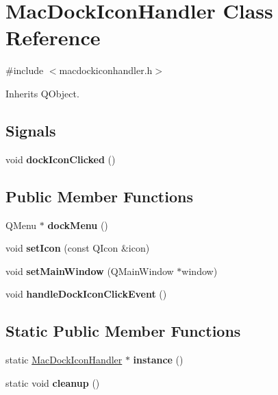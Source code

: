 \hypertarget{class_mac_dock_icon_handler}{}\section{Mac\+Dock\+Icon\+Handler Class Reference}
\label{class_mac_dock_icon_handler}


{\ttfamily \#include $<$macdockiconhandler.\+h$>$}



Inherits Q\+Object.

\subsection*{Signals}
\begin{DoxyCompactItemize}
\item 
\mbox{\label{class_mac_dock_icon_handler_ae75bf0cda7a9c1a8fbc24af59b9f0e0f}} 
void {\bfseries dock\+Icon\+Clicked} ()
\end{DoxyCompactItemize}
\subsection*{Public Member Functions}
\begin{DoxyCompactItemize}
\item 
\mbox{\label{class_mac_dock_icon_handler_a8aff3dc6410687e432f8d9314eba0ab9}} 
Q\+Menu $\ast$ {\bfseries dock\+Menu} ()
\item 
\mbox{\label{class_mac_dock_icon_handler_a537f8eb3c9752089e3e2e0e30011a65b}} 
void {\bfseries set\+Icon} (const Q\+Icon \&icon)
\item 
\mbox{\label{class_mac_dock_icon_handler_a4d2d18c7d56286ea745e349497941293}} 
void {\bfseries set\+Main\+Window} (Q\+Main\+Window $\ast$window)
\item 
\mbox{\label{class_mac_dock_icon_handler_a38f422d9dde7df4ccfdda97b08467e0a}} 
void {\bfseries handle\+Dock\+Icon\+Click\+Event} ()
\end{DoxyCompactItemize}
\subsection*{Static Public Member Functions}
\begin{DoxyCompactItemize}
\item 
\mbox{\label{class_mac_dock_icon_handler_afd3ef7126d0b6ef02eaf85e5455fe6f4}} 
static \mbox{\hyperlink{class_mac_dock_icon_handler}{Mac\+Dock\+Icon\+Handler}} $\ast$ {\bfseries instance} ()
\item 
\mbox{\label{class_mac_dock_icon_handler_aee1895384db9ebce8365d0fd7decc9db}} 
static void {\bfseries cleanup} ()
\end{DoxyCompactItemize}


